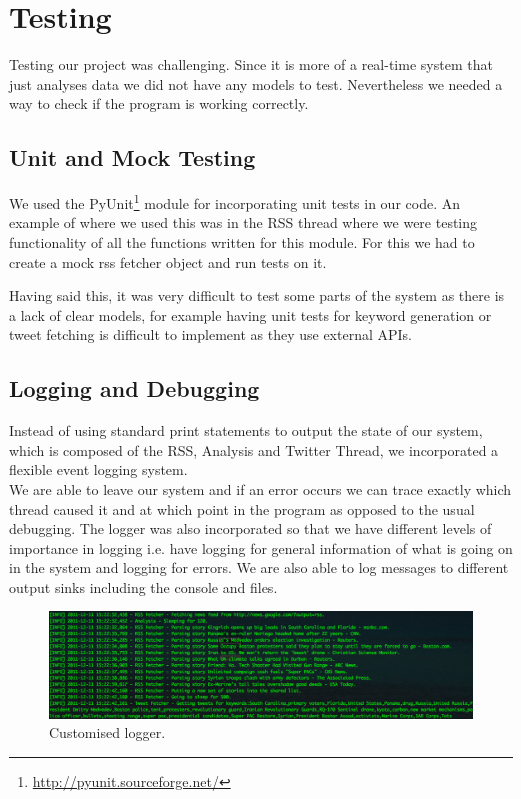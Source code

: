 \documentclass{report}
\begin{document}
			\section{Testing}
			  Testing our project was challenging. Since it is more of a real-time system that just analyses data we did not have any models to test. Nevertheless we needed a way to check if the program is working correctly.

			  \subsection{Unit and Mock Testing}

			  We used the PyUnit\footnote{\url{http://pyunit.sourceforge.net/}} module for incorporating unit tests in our code. An example of where we used this was in the RSS thread where we were testing functionality of all the functions written for this module. For this we had to create a mock rss fetcher object and run tests on it.

			  Having said this, it was very difficult to test some parts of the system as there is a lack of clear models, for example having unit tests for keyword generation or tweet fetching is difficult to implement as they use external APIs.

			  \subsection{Logging and Debugging}

			  Instead of using standard print statements to output the state of our system, which is composed of the RSS, Analysis and Twitter Thread, we incorporated a flexible event logging system.\\
			We are able to leave our system and if an error occurs we can trace exactly which thread caused it and at which point in the program as opposed to the usual debugging.
		  The logger was also incorporated so that we have different levels of importance in logging i.e. have logging for general information of what is going on in the system and logging for errors. We are also able to log messages to different output sinks including the console and files.

				\begin{figure}
				 \includegraphics[scale=0.32]{logger.png}
				 \caption{\label{fig:logger} Customised logger.}
				\end{figure}
				
\end{document}
